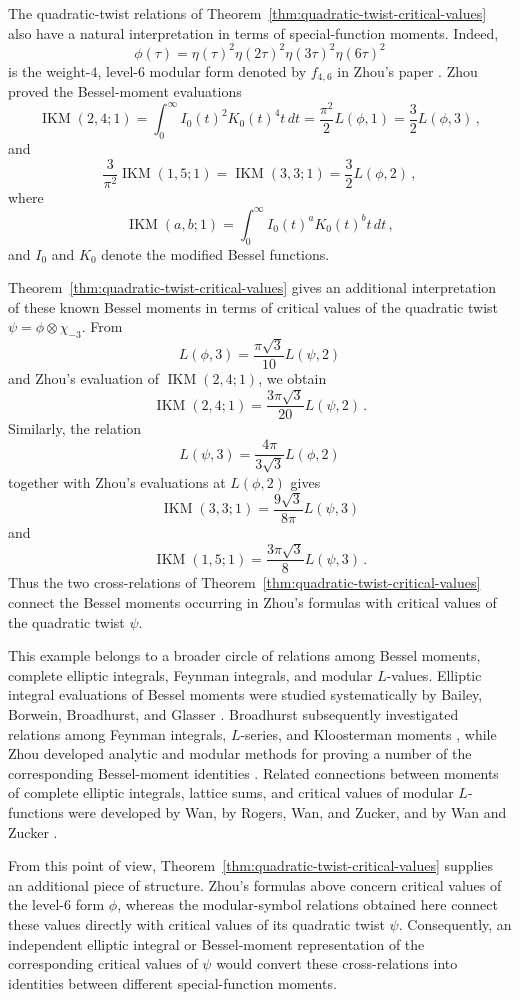 \documentclass[preprint,12pt]{elsarticle}
\theoremstyle{definition}
\theoremstyle{remark}
\begin{document}
The quadratic-twist relations of Theorem~\ref{thm:quadratic-twist-critical-values} also have a natural interpretation in terms of special-function moments. Indeed,
$$\phi(\tau)=\eta(\tau)^2\eta(2\tau)^2\eta(3\tau)^2\eta(6\tau)^2$$
is the weight-$4$, level-$6$ modular form denoted by $f_{4,6}$ in Zhou's paper \cite{MR3798884}. Zhou proved the Bessel-moment evaluations
$$\operatorname{IKM}(2,4;1)=\int_0^\infty I_0(t)^2K_0(t)^4t\,dt=\frac{\pi^2}{2}L(\phi,1)=\frac{3}{2}L(\phi,3)\,,$$
and
$$\frac{3}{\pi^2}\operatorname{IKM}(1,5;1)=\operatorname{IKM}(3,3;1)=\frac{3}{2}L(\phi,2)\,,$$
where
$$\operatorname{IKM}(a,b;1)=\int_0^\infty I_0(t)^aK_0(t)^b t\,dt\,,$$
and $I_0$ and $K_0$ denote the modified Bessel functions.

Theorem~\ref{thm:quadratic-twist-critical-values} gives an additional interpretation of these known Bessel moments in terms of critical values of the quadratic twist $\psi=\phi\otimes\chi_{-3}$. From
$$L(\phi,3)=\frac{\pi\sqrt{3}}{10}L(\psi,2)$$
and Zhou's evaluation of $\operatorname{IKM}(2,4;1)$, we obtain
$$\operatorname{IKM}(2,4;1)=\frac{3\pi\sqrt{3}}{20}L(\psi,2)\,.$$
Similarly, the relation
$$L(\psi,3)=\frac{4\pi}{3\sqrt{3}}L(\phi,2)$$
together with Zhou's evaluations at $L(\phi,2)$ gives
$$\operatorname{IKM}(3,3;1)=\frac{9\sqrt{3}}{8\pi}L(\psi,3)$$
and
$$\operatorname{IKM}(1,5;1)=\frac{3\pi\sqrt{3}}{8}L(\psi,3)\,.$$
Thus the two cross-relations of Theorem~\ref{thm:quadratic-twist-critical-values} connect the Bessel moments occurring in Zhou's formulas with critical values of the quadratic twist $\psi$.

This example belongs to a broader circle of relations among Bessel moments, complete elliptic integrals, Feynman integrals, and modular $L$-values. Elliptic integral evaluations of Bessel moments were studied systematically by Bailey, Borwein, Broadhurst, and Glasser \cite{MR2450513}. Broadhurst subsequently investigated relations among Feynman integrals, $L$-series, and Kloosterman moments \cite{MR3573666}, while Zhou developed analytic and modular methods for proving a number of the corresponding Bessel-moment identities \cite{MR3798884}. Related connections between moments of complete elliptic integrals, lattice sums, and critical values of modular $L$-functions were developed by Wan, by Rogers, Wan, and Zucker, and by Wan and Zucker \cite{MR2845511,MR3338042,MR3490555}.

From this point of view, Theorem~\ref{thm:quadratic-twist-critical-values} supplies an additional piece of structure. Zhou's formulas above concern critical values of the level-$6$ form $\phi$, whereas the modular-symbol relations obtained here connect these values directly with critical values of its quadratic twist $\psi$. Consequently, an independent elliptic integral or Bessel-moment representation of the corresponding critical values of $\psi$ would convert these cross-relations into identities between different special-function moments.
\end{document}
